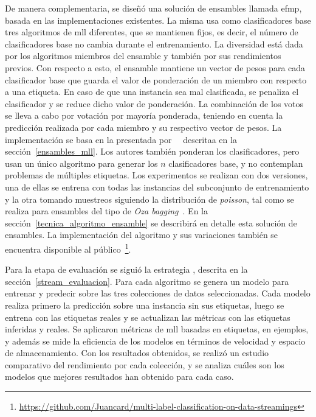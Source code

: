 De manera complementaria, se diseñó una solución de ensambles llamada
\acrfull{efmp}, basada en las implementaciones existentes. La misma usa como
clasificadores base tres algoritmos de \acrshort{mll} diferentes, que se
mantienen fijos, es decir, el número de clasificadores base no cambia durante el
entrenamiento. La diversidad está dada por los algoritmos miembros del ensamble
y también por sus rendimientos previos. Con respecto a esto, el ensamble
mantiene un vector de pesos para cada clasificador base que guarda el valor de
ponderación de un miembro con respecto a una etiqueta. En caso de que una
instancia sea mal clasificada, se penaliza el clasificador y se reduce dicho
valor de ponderación. La combinación de los votos se lleva a cabo por votación
por mayoría ponderada, teniendo en cuenta la predicción realizada por cada
miembro y su respectivo vector de pesos. La implementación se basa en la
presentada por~\citeauthor{kolter_dynamic_2007}~\cite{kolter_dynamic_2007}
descritaa en la sección~\ref{ensambles_mll}. Los autores también ponderan los
clasificadores, pero usan un único algoritmo para generar los $n$ clasificadores
base, y no contemplan problemas de múltiples etiquetas. Los experimentos se
realizan con dos versiones, una de ellas se entrena con todas las instancias del
subconjunto de entrenamiento y la otra tomando muestreos siguiendo la
distribución de \textit{poisson}, tal como se realiza para ensambles del tipo de
\textit{Oza bagging}~\cite{oza_online_2005}. En la
sección~\ref{tecnica_algoritmo_ensamble} se describirá en detalle esta solución
de ensambles. La implementación del algoritmo y sus variaciones también se
encuentra disponible al
público~\footnote{\url{https://github.com/Juancard/multi-label-classification-on-data-streamings}}.

Para la etapa de evaluación se siguió la estrategia
, descrita en la sección~\ref{stream_evaluacion}.
Para cada algoritmo se genera un modelo para entrenar y predecir sobre las tres
colecciones de datos seleccionadas. Cada modelo realiza primero la predicción
sobre una instancia sin sus etiquetas, luego se entrena con las etiquetas reales
y se actualizan las métricas con las etiquetas inferidas y reales. Se aplicaron
métricas de \acrshort{mll} basadas en etiquetas, en ejemplos, y además se mide
la eficiencia de los modelos en términos de velocidad y espacio de
almacenamiento. Con los resultados obtenidos, se realizó un estudio comparativo
del rendimiento por cada colección, y se analiza cuáles son los modelos que
mejores resultados han obtenido para cada caso.

